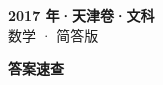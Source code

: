 \documentclass[zihao=-4, a4paper]{ctexart}
\begin{document}
\begin{center}
  {\Large\bfseries 2017 年·天津卷·文科}\\[4pt]
  {\large 数学 · 简答版}
\end{center}
\medskip
{}

\clearpage
{}
\begin{center}{\Large\bfseries 答案速查}\end{center}
\medskip

\end{document}
